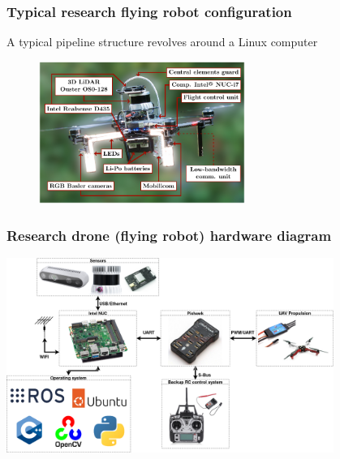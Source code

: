 \documentclass[aspectratio=169,9pt]{beamer}
\begin{document}
\begin{frame}
  \frametitle{Typical research flying robot configuration}

  \begin{block}{A typical pipeline structure revolves around a Linux computer}
    \begin{figure}
      \includegraphics[width=0.6\textwidth]{fig/x500_labeled.pdf}
    \end{figure}
  \end{block}

\end{frame}

\begin{frame}
  \frametitle{Research drone (flying robot) hardware diagram}

\begin{center}
  \includegraphics[width=0.8\textwidth]{./fig/new_diagram.png}
\end{center}

\end{frame}



\end{document}
